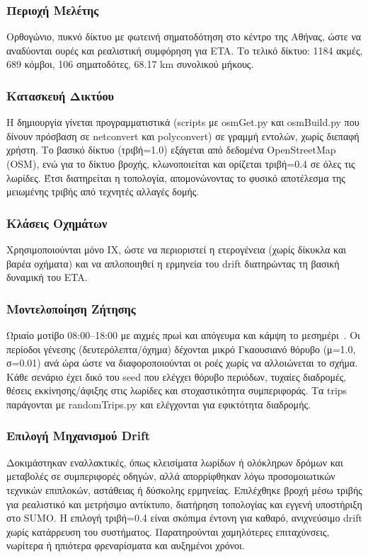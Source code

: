 \subsubsection*{Περιοχή Μελέτης}
Ορθογώνιο, πυκνό δίκτυο με φωτεινή σηματοδότηση στο κέντρο της Αθήνας, ώστε να αναδύονται ουρές και ρεαλιστική συμφόρηση για ETA.
Το τελικό δίκτυο: 1184 ακμές, 689 κόμβοι, 106 σηματοδότες, 68.17 km συνολικού μήκους.

\subsubsection*{Κατασκευή Δικτύου}
Η δημιουργία γίνεται προγραμματιστικά (scripts με osmGet.py και osmBuild.py που δίνουν πρόσβαση σε netconvert και polyconvert) σε γραμμή εντολών, χωρίς διεπαφή χρήστη.
Το βασικό δίκτυο (τριβή=1.0) εξάγεται από δεδομένα OpenStreetMap (OSM), ενώ για το δίκτυο βροχής, κλωνοποιείται και ορίζεται τριβή=0.4 σε όλες τις λωρίδες.
Έτσι διατηρείται η τοπολογία, απομονώνοντας το φυσικό αποτέλεσμα της μειωμένης τριβής από τεχνητές αλλαγές δομής.

\subsubsection*{Κλάσεις Οχημάτων}
Χρησιμοποιούνται μόνο ΙΧ, ώστε να περιοριστεί η ετερογένεια (χωρίς δίκυκλα και βαρέα οχήματα) και να απλοποιηθεί η ερμηνεία του drift διατηρώντας τη βασική δυναμική του ETA.

\subsubsection*{Μοντελοποίηση Ζήτησης}
Ωριαίο μοτίβο 08:00–18:00 με αιχμές πρωί και απόγευμα και κάμψη το μεσημέρι~\cite{amob2025}.
Οι περίοδοι γένεσης (δευτερόλεπτα/όχημα) δέχονται μικρό Γκαουσιανό θόρυβο (μ=1.0, σ=0.01) ανά ώρα ώστε να διαφοροποιούνται οι ροές χωρίς να αλλοιώνεται το σχήμα.
Κάθε σενάριο έχει δικό του seed που ελέγχει θόρυβο περιόδων, τυχαίες διαδρομές, θέσεις εκκίνησης/άφιξης στις λωρίδες και στοχαστικότητα συμπεριφοράς.
Τα trips παράγονται με randomTrips.py και ελέγχονται για εφικτότητα διαδρομής.

\subsubsection*{Επιλογή Μηχανισμού Drift}
Δοκιμάστηκαν εναλλακτικές, όπως κλεισίματα λωρίδων ή ολόκληρων δρόμων και μεταβολές σε συμπεριφορές οδηγών, αλλά απορρίφθηκαν λόγω προσομοιωτικών τεχνικών επιπλοκών, αστάθειας ή δύσκολης ερμηνείας.
Επιλέχθηκε βροχή μέσω τριβής για ρεαλιστικό και μετρήσιμο αντίκτυπο, διατήρηση τοπολογίας και εγγενή υποστήριξη στο SUMO.
Η επιλογή τριβή=0.4 είναι σκόπιμα έντονη για καθαρό, ανιχνεύσιμο drift χωρίς κατάρρευση του συστήματος.
Παρατηρούνται χαμηλότερες επιταχύνσεις, νωρίτερα ή ηπιότερα φρεναρίσματα και αυξημένοι χρόνοι.

